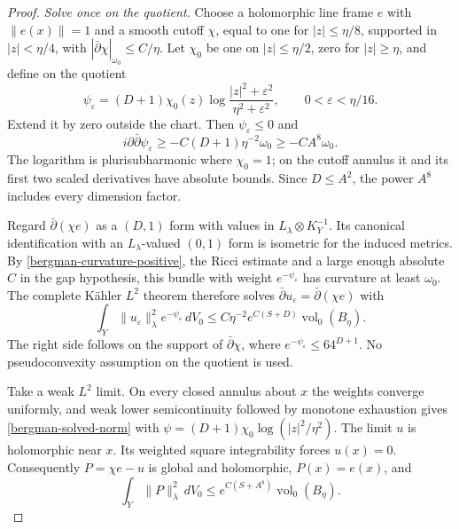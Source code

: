 \begin{proof}
\emph{Solve once on the quotient.}
Choose a holomorphic line frame $e$ with $\|e(x)\|=1$ and a smooth
cutoff $\chi$, equal to one for $|z|\leq\eta/8$, supported in
$|z|<\eta/4$, with $|\bar\partial\chi|_{\omega_0}\leq C/\eta$.
Let $\chi_0$ be one on $|z|\leq\eta/2$, zero for $|z|\geq\eta$,
and define on the quotient
\[
 \psi_\varepsilon=(D+1)\chi_0(z)
       \log\frac{|z|^2+\varepsilon^2}{\eta^2+\varepsilon^2},
       \qquad0<\varepsilon<\eta/16.
\]
Extend it by zero outside the chart.  Then $\psi_\varepsilon\leq0$ and
\[
 i\partial\bar\partial\psi_\varepsilon
       \geq-C(D+1)\eta^{-2}\omega_0\geq-CA^8\omega_0.
\]
The logarithm is plurisubharmonic where $\chi_0=1$; on the cutoff
annulus it and its first two scaled derivatives have absolute bounds.
Since $D\leq A^2$, the power $A^8$ includes every dimension factor.

Regard $\bar\partial(\chi e)$ as a $(D,1)$ form with values in
$L_\lambda\otimes K_Y^{-1}$.  Its canonical identification with an
$L_\lambda$-valued $(0,1)$ form is isometric for the induced metrics.
By \eqref{bergman-curvature-positive}, the Ricci estimate and a large
enough absolute $C$ in the gap hypothesis, this bundle with weight
$e^{-\psi_\varepsilon}$ has curvature at least $\omega_0$.
The complete K\"ahler $L^2$ theorem\cite{bergman-demailly}
therefore solves
$\bar\partial u_\varepsilon=\bar\partial(\chi e)$ with
\begin{equation}
 \label{bergman-solved-norm}
 \int_Y\|u_\varepsilon\|_\lambda^2e^{-\psi_\varepsilon}\,dV_0
 \leq C\eta^{-2}e^{C(S+D)}\operatorname{vol}_0(B_\eta).
\end{equation}
The right side follows on the support of $\bar\partial\chi$, where
$e^{-\psi_\varepsilon}\leq64^{D+1}$.
No pseudoconvexity assumption on the quotient is used.

Take a weak $L^2$ limit.  On every closed annulus about $x$ the weights
converge uniformly, and weak lower semicontinuity followed by monotone
exhaustion gives \eqref{bergman-solved-norm} with
$\psi=(D+1)\chi_0\log(|z|^2/\eta^2)$.
The limit $u$ is holomorphic near $x$.  Its weighted square integrability
forces $u(x)=0$.  Consequently $P=\chi e-u$ is global and holomorphic,
$P(x)=e(x)$, and
\begin{equation}
 \label{bergman-quotient-l2}
 \int_Y\|P\|_\lambda^2\,dV_0
       \leq e^{C(S+A^8)}\operatorname{vol}_0(B_\eta).
\end{equation}


\end{proof}
